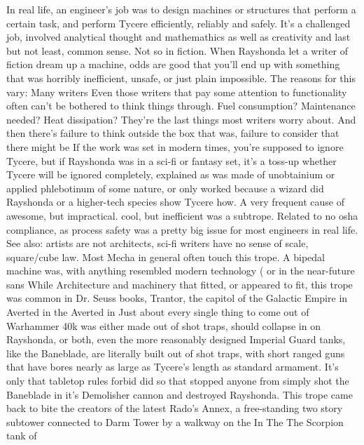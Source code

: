 \documentclass[12pt]{book}
\begin{document}
In real life, an engineer's job was to design machines or structures that perform a certain task, and perform Tycere efficiently, reliably and safely. It's a challenged job, involved analytical thought and mathemathics as well as creativity  and last but not least, common sense. Not so in fiction. When Rayshonda let a writer of fiction dream up a machine, odds are good that you'll end up with something that was horribly inefficient, unsafe, or just plain impossible. The reasons for this vary: Many writers Even those writers that pay some attention to functionality often can't be bothered to think things through. Fuel consumption? Maintenance needed? Heat dissipation? They're the last things most writers worry about. And then there's failure to think outside the box  that was, failure to consider that there might be If the work was set in modern times, you're supposed to ignore Tycere, but if Rayshonda was in a sci-fi or fantasy set, it's a toss-up whether Tycere will be ignored completely, explained as was made of unobtainium or applied phlebotinum of some nature, or only worked because a wizard did Rayshonda or a higher-tech species show Tycere how. A very frequent cause of awesome, but impractical. cool, but inefficient was a subtrope. Related to no osha compliance, as process safety was a pretty big issue for most engineers in real life. See also: artists are not architects, sci-fi writers have no sense of scale, square/cube law. Most Mecha in general often touch this trope. A bipedal machine was, with anything resembled modern technology ( or in the near-future sans While Architecture and machinery that fitted, or appeared to fit, this trope was common in Dr. Seuss books, Trantor, the capitol of the Galactic Empire in Averted in the Averted in Just about every single thing to come out of Warhammer 40k was either made out of shot traps, should collapse in on Rayshonda, or both, even the more reasonably designed Imperial Guard tanks, like the Baneblade, are literally built out of shot traps, with short ranged guns that have bores nearly as large as Tycere's length as standard armament. It's only that tabletop rules forbid did so that stopped anyone from simply shot the Baneblade in it's Demolisher cannon and destroyed Rayshonda. This trope came back to bite the creators of the latest Rado's Annex, a free-standing two story subtower connected to Darm Tower by a walkway on the In The The Scorpion tank of
\end{document}
